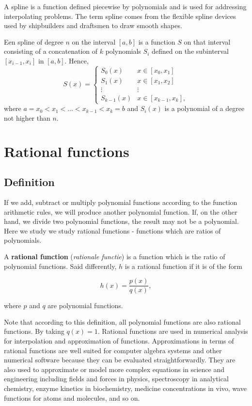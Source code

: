 \ifcourse
\begin{remark}[Splines]
A spline is a function defined piecewise by polynomials and is used for addressing interpolating problems. The term spline comes from the flexible spline devices used by shipbuilders and draftsmen to draw smooth shapes.

Een spline of degree $n$ on the interval $[a,b]$ is a function $S$ on that interval consisting of a concatenation of $k$ polynomials  $S_{i}$ defined on the subinterval $[x_{i-1},x_{i}]$ in  $[a,b]$. Hence,
$$
\displaystyle S(x)={\begin{cases}S_{0}(x)&x\in [x_{0},x_{1}]\\S_{1}(x)&x\in [x_{1},x_{2}]\\\vdots &\vdots \\S_{k-1}(x)&x\in [x_{k-1},x_{k}],\end{cases}} 
$$
where $a=x_{0}<x_{1}<...<x_{k-1}<x_{k}=b$ and $S_i(x)$ is a polynomial of a degree not higher than $n$. 
\end{remark}
\fi


\section{Rational functions}
\label{rat_functies}
\subsection{Definition}
If we add, subtract or multiply polynomial functions according to the function arithmetic rules, we will produce another polynomial function. If, on the other hand, we divide two polynomial functions, the result may not be a polynomial.  Here we study we study rational functions - functions which are ratios of polynomials.

\begin{definition}
  \label{rationalfunction} A \textbf{rational function} (\textit{rationale functie}) is a function which is the ratio of polynomial functions.  Said differently, $h$ is a rational function if it is of the form 

\[ h(x) = \dfrac{p(x)}{q(x)},\]

where $p$ and $q$ are polynomial functions.

\end{definition}

Note that according to this definition, all polynomial functions are also  rational functions. By taking $q(x) = 1$. Rational functions are used in numerical analysis for interpolation and approximation of functions. Approximations in terms of rational functions are well suited for computer algebra systems and other numerical software because they can be evaluated straightforwardly. They are also used to approximate or model more complex equations in science and engineering including fields and forces in physics, spectroscopy in analytical chemistry, enzyme kinetics in biochemistry, medicine concentrations in vivo, wave functions for atoms and molecules, and so on. 

